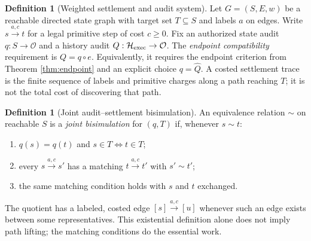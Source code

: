 \documentclass[11pt,letterpaper]{article}
\theoremstyle{definition}
\newtheorem{definition}[theorem]{Definition}
\newcommand{\Hh}{\mathcal H}
\newcommand{\Obs}{\mathcal O}
\begin{document}
\begin{definition}[Weighted settlement and audit system]
Let $G=(S,E,w)$ be a reachable directed state graph with target set $T\subseteq S$ and labels $a$ on edges. Write $s\xrightarrow{a,c}t$ for a legal primitive step of cost $c\ge0$. Fix an authorized state audit $q:S\to\Obs$ and a history audit $Q:\Hh_{\rm exec}\to\Obs$. The \emph{endpoint compatibility} requirement is $Q=q\circ e$. Equivalently, it requires the endpoint criterion from Theorem \ref{thm:endpoint} and an explicit choice $q=\widehat Q$. A costed settlement trace is the finite sequence of labels and primitive charges along a path reaching $T$; it is not the total cost of discovering that path.
\end{definition}

\begin{definition}[Joint audit--settlement bisimulation]
An equivalence relation $\sim$ on reachable $S$ is a \emph{joint bisimulation} for $(q,T)$ if, whenever $s\sim t$:
\begin{enumerate}[label=(\roman*)]
\item $q(s)=q(t)$ and $s\in T\iff t\in T$;
\item every $s\xrightarrow{a,c}s'$ has a matching $t\xrightarrow{a,c}t'$ with $s'\sim t'$;
\item the same matching condition holds with $s$ and $t$ exchanged.
\end{enumerate}
The quotient has a labeled, costed edge $[s]\xrightarrow{a,c}[u]$ whenever such an edge exists between some representatives. This existential definition alone does not imply path lifting; the matching conditions do the essential work.
\end{definition}
\end{document}
